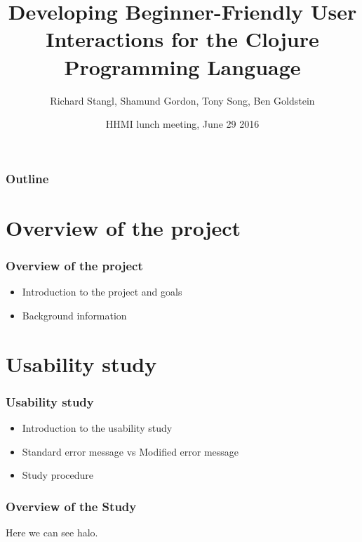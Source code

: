 \documentclass{beamer}
\begin{document}
\title{Developing Beginner-Friendly User Interactions for the Clojure Programming Language}
\author{Richard Stangl, Shamund Gordon, Tony Song, Ben Goldstein}
\date[]  
{HHMI lunch meeting, June 29 2016}

\begin{frame}
  \titlepage
\end{frame}


\begin{frame}

\frametitle{Outline}
\tableofcontents
\end{frame}

\section{Overview of the project}

\begin{frame}
  \frametitle{Overview of the project}
\begin{itemize}
\item Introduction to the project and goals
\item Background information
\end{itemize}
\end{frame}




\section{Usability study}

\begin{frame}
  \frametitle{Usability study}
\begin{itemize}
\item Introduction to the usability study 
\item Standard error message vs Modified error message
\item Study procedure
\end{itemize}
\end{frame}

\begin{frame}
  \frametitle{Overview of the Study}
\begin{figure}

\end{figure}

Here we can see halo. 
\end{frame}
\end{document}

